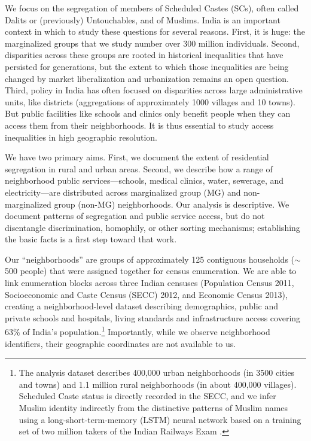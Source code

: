 \documentclass[12pt]{article}
\begin{document}
We focus on the segregation of members of Scheduled Castes (SCs), often called Dalits or (previously) Untouchables, and of Muslims. India is an important context in which to study these questions for several reasons. First, it is huge: the marginalized groups that we study number over 300 million individuals. Second, disparities across these groups are rooted in historical inequalities that have persisted for generations, but the extent to which those inequalities are being changed by market liberalization and urbanization remains an open question. Third, policy in India has often focused on disparities across large administrative units, like districts (aggregations of approximately 1000 villages and 10 towns). But public facilities like schools and clinics only benefit people when they can access them from their neighborhoods. It is thus essential to study access inequalities in high geographic resolution.

We have two primary aims. First, we document the extent of residential segregation in rural and urban areas. Second, we describe how a range of neighborhood public services---schools, medical clinics, water, sewerage, and electricity---are distributed across marginalized group (MG) and non-marginalized group (non-MG) neighborhoods. Our analysis is descriptive. We document patterns of segregation and public service access, but do not disentangle discrimination, homophily, or other sorting mechanisms; establishing the basic facts is a first step toward that work.

Our ``neighborhoods'' are groups of approximately 125 contiguous households ($\sim$500 people) that were assigned together for census enumeration. We are able to link enumeration blocks across three Indian censuses (Population Census 2011, Socioeconomic and Caste Census (SECC) 2012, and Economic Census 2013), creating a neighborhood-level dataset describing demographics, public and private schools and hospitals, living standards and infrastructure access covering 63\% of India's population.\footnote{The analysis dataset describes 400,000 urban neighborhoods (in 3500 cities and towns) and 1.1 million rural neighborhoods (in about 400,000 villages). Scheduled Caste status is directly recorded in the SECC, and we infer Muslim identity indirectly from the distinctive patterns of Muslim names using a long-short-term-memory (LSTM) neural network based on a training set of two million takers of the Indian Railways Exam \citep{ash2025}.} Importantly, while we observe neighborhood identifiers, their geographic coordinates are not available to us.
\end{document}
